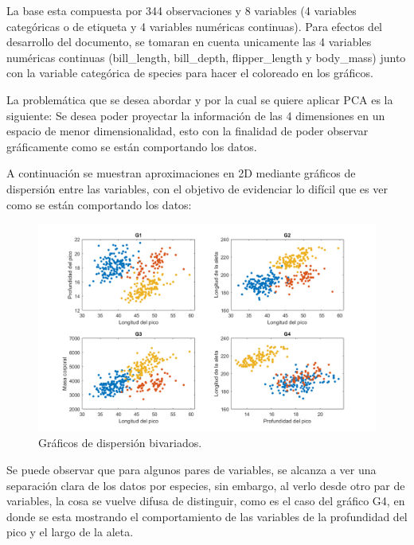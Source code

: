 \documentclass[11pt, letterpaper]{article}
\begin{document}
La base esta compuesta por 344 observaciones y 8 variables (4 variables categóricas o de etiqueta y 4 variables numéricas continuas). Para efectos del desarrollo del documento, se tomaran en cuenta unicamente las 4 variables numéricas continuas (bill\_length, bill\_depth, flipper\_length y body\_mass) junto con la variable categórica de species para hacer el coloreado en los gráficos.


\newpage

La problemática que se desea abordar y  por la cual se quiere aplicar PCA es la siguiente: Se desea poder proyectar la información de las 4 dimensiones en un espacio de menor dimensionalidad, esto con la finalidad de poder observar gráficamente como se están comportando los datos.

A continuación se muestran aproximaciones en 2D mediante gráficos de dispersión entre las variables, con el objetivo de evidenciar lo difícil que es ver como se están comportando los datos:


\begin{figure}[h!]
	\centering
	\begin{minipage}{1.1\textwidth}
		\centering
		\includegraphics[width=\textwidth]{IMG/G1.png}
		\caption{Gráficos de dispersión bivariados.}
		\label{fig:f2}
	\end{minipage}\hfill
\end{figure}

Se puede observar que para algunos pares de variables, se alcanza a ver una separación clara de los datos por especies, sin embargo, al verlo desde otro par de variables, la cosa se vuelve difusa de distinguir, como es el caso del gráfico G4, en donde se esta mostrando el comportamiento de las variables de la profundidad del pico y el largo de la aleta.
\end{document}
